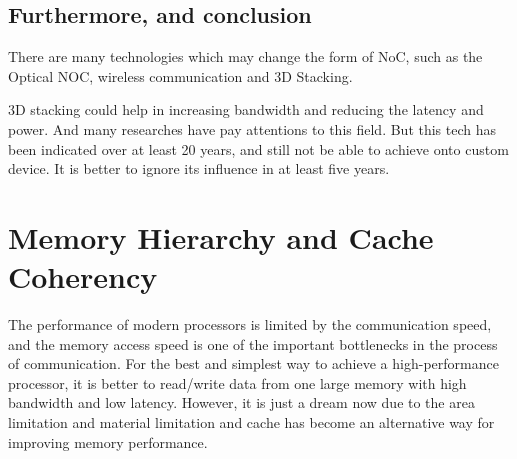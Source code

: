 \subsection{Furthermore, and conclusion}
\par There are many technologies which may change the form of NoC, such as the Optical NOC\cite{vantrease2011atomic}, wireless communication\cite{abadal2015broadcast} and 3D Stacking.
\par 3D stacking could help in increasing bandwidth and reducing the latency and power\cite{asanovic2006landscape}. And many researches have pay attentions to this field\cite{murali2009synthesis}. But this tech has been indicated over at least 20 years, and still not be able to achieve onto custom device. It is better to ignore its influence in at least five years. 
\section{Memory Hierarchy and Cache Coherency}
\par The performance of modern processors is limited by the communication speed, and the memory access speed is one of the important bottlenecks in the process of communication. For the best and simplest way to achieve a high-performance processor, it is better to read/write data from one large memory with high bandwidth and low latency. However, it is just a dream now due to the area limitation and material limitation and cache has become an alternative way for improving memory performance. 
